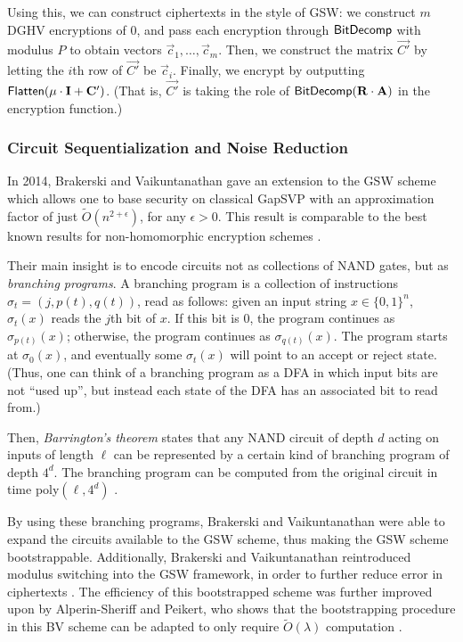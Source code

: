     Using this, we can construct ciphertexts in the style of GSW: we construct $m$ DGHV encryptions of $0$, and pass each encryption through ${\sf BitDecomp}$ with modulus $P$ to obtain vectors $\vec{c}_1, \dots, \vec{c}_m$. Then, we construct the matrix $\vec{C'}$ by letting the $i$th row of $\vec{C'}$ be $\vec{c}_i$. Finally, we encrypt by outputting ${\sf Flatten}(\mu \cdot \vec{I} + \vec{C'})$. (That is, $\vec{C'}$ is taking the role of ${\sf BitDecomp}(\vec{R} \cdot \vec{A})$ in the encryption function.)

    \subsubsection{Circuit Sequentialization and Noise Reduction}
    In 2014, Brakerski and Vaikuntanathan gave an extension to the GSW scheme which allows one to base security on classical GapSVP with an approximation factor of just $\widetilde{O}(n^{2 + \epsilon})$, for any $\epsilon > 0$. This result is comparable to the best known results for non-homomorphic encryption schemes \cite{bv14}.

    Their main insight is to encode circuits not as collections of NAND gates, but as \emph{branching programs}. A branching program is a collection of instructions $\sigma_t = (j, p(t), q(t))$, read as follows: given an input string $x \in \{0,1\}^n$, $\sigma_t(x)$ reads the $j$th bit of $x$. If this bit is $0$, the program continues as $\sigma_{p(t)}(x)$; otherwise, the program continues as $\sigma_{q(t)}(x)$. The program starts at $\sigma_0(x)$, and eventually some $\sigma_t(x)$ will point to an accept or reject state. (Thus, one can think of a branching program as a DFA in which input bits are not ``used up'', but instead each state of the DFA has an associated bit to read from.)

    Then, \emph{Barrington's theorem} states that any NAND circuit of depth $d$ acting on inputs of length $\ell$ can be represented by a certain kind of branching program of depth $4^d$. The branching program can be computed from the original circuit in time poly$(\ell, 4^d)$ \cite{Barrington}.

     By using these branching programs, Brakerski and Vaikuntanathan were able to expand the circuits available to the GSW scheme, thus making the GSW scheme bootstrappable. Additionally, Brakerski and Vaikuntanathan reintroduced modulus switching into the GSW framework, in order to further reduce error in ciphertexts \cite{bv14}. The efficiency of this bootstrapped scheme was further improved upon by Alperin-Sheriff and Peikert, who shows that the bootstrapping procedure in this BV scheme can be adapted to only require $\widetilde{O}(\lambda)$ computation \cite{A2014}.
